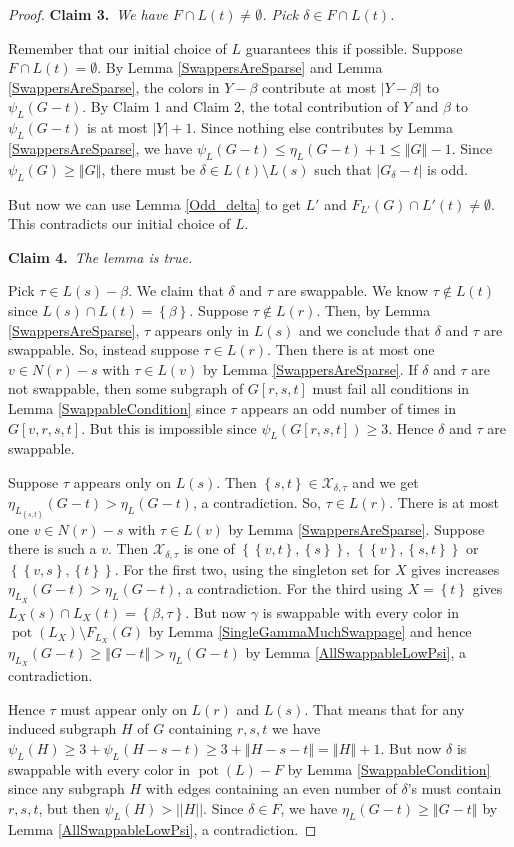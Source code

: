 \documentclass[12pt]{article}
\theoremstyle{plain}
\theoremstyle{definition}
\theoremstyle{remark}
\newcommand{\fancy}[1]{\mathcal{#1}}
\newcommand{\set}[1]{\left\{ #1 \right\}}
\newcommand{\card}[1]{\left|#1\right|}
\newcommand{\size}[1]{\left\Vert#1\right\Vert}
\newcommand{\pot}{\operatorname{pot}}
\def\X{\fancy{X}}
\newcommand{\claim}[2]{{\bf Claim #1.}~{\it #2}~~}
\begin{document}
\begin{proof}
		\claim{3}{We have $F \cap L(t) \ne \emptyset$.  Pick $\delta \in F \cap L(t)$.}
		
		Remember that our initial choice of $L$ guarantees this if possible.  Suppose $F \cap L(t) = \emptyset$.  By Lemma \ref{SwappersAreSparse} and Lemma \ref{SwappersAreSparse}, the colors in $Y - \beta$ contribute at most $|Y - \beta|$ to $\psi_L(G - t)$.  By Claim 1 and Claim 2, the total contribution of $Y$ and $\beta$ to $\psi_L(G - t)$ is at most $\card{Y} + 1$.  Since nothing else contributes by  Lemma \ref{SwappersAreSparse}, we have $\psi_L(G - t) \le \eta_L(G - t) + 1 \le \size{G} - 1$.  Since $\psi_L(G) \ge \size{G}$, there must be $\delta \in L(t) \setminus L(s)$ such that $\card{G_\delta - t}$ is odd.
		
	    But now we can use Lemma \ref{Odd_delta} to get $L'$ and $F_{L'}(G) \cap L'(t) \ne \emptyset$.  This contradicts our initial choice of $L$.

		\claim{4}{The lemma is true.}
		
			Pick $\tau \in L(s) - \beta$.   We claim that $\delta$ and $\tau$ are swappable.  We know $\tau \not \in L(t)$ since $L(s) \cap L(t) = \set{\beta}$.  Suppose $\tau \not \in L(r)$.  Then, by Lemma \ref{SwappersAreSparse}, $\tau$ appears only in $L(s)$ and we conclude that $\delta$ and $\tau$ are swappable.  So, instead suppose $\tau \in L(r)$.  Then there is at most one $v \in N(r) - s$ with $\tau \in L(v)$ by Lemma \ref{SwappersAreSparse}.  If $\delta$ and $\tau$ are not swappable, then some subgraph of $G[r,s,t]$ must fail all conditions in Lemma \ref{SwappableCondition} since $\tau$ appears an odd number of times in $G[v,r,s,t]$.  But this is impossible since $\psi_L(G[r,s,t]) \ge 3$.  Hence $\delta$ and $\tau$ are swappable.
			
			Suppose $\tau$ appears only on $L(s)$. Then $\set{s,t} \in \X_{\delta,\tau}$ and we get $\eta_{L_{\set{s,t}}}(G - t) > \eta_L(G - t)$, a contradiction.  So, $\tau \in L(r)$.  There is at most one $v \in N(r) - s$ with $\tau \in L(v)$ by Lemma \ref{SwappersAreSparse}.  Suppose there is such a $v$.  Then $\X_{\delta,\tau}$ is one of $\set{\set{v,t}, \set{s}}$, $\set{\set{v}, \set{s, t}}$ or $\set{\set{v,s}, \set{t}}$.  For the first two, using the singleton set for $X$ gives increases $\eta_{L_X}(G - t) > \eta_L(G - t)$, a contradiction.  For the third using $X = \set{t}$ gives $L_X(s) \cap L_X(t) = \set{\beta, \tau}$.  But now $\gamma$ is swappable with every color in $\pot(L_X) \setminus F_{L_X}(G)$ by Lemma \ref{SingleGammaMuchSwappage} and hence $\eta_{L_X}(G-t) \ge \size{G-t} > \eta_L(G-t)$ by Lemma \ref{AllSwappableLowPsi}, a contradiction.
			
			Hence $\tau$ must appear only on $L(r)$ and $L(s)$.  That means that for any induced subgraph $H$ of $G$ containing $r,s,t$ we have $\psi_L(H) \ge 3 + \psi_L(H-s-t) \ge 3 + \size{H-s-t} = \size{H} + 1$.  But now $\delta$ is swappable with every color in $\pot(L) - F$ by Lemma \ref{SwappableCondition} since any subgraph $H$ with edges containing an even number of $\delta$'s must contain $r,s,t$, but then $\psi_L(H) > ||H||$.  Since $\delta \in F$, we have $\eta_{L}(G-t) \ge \size{G-t}$ by Lemma \ref{AllSwappableLowPsi}, a contradiction.
	\end{proof}
	
\end{document}
